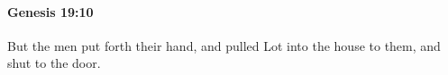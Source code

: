 
		\paragraph{Genesis 19:10} %
			\label{GENESIS-19-10}

			But the men put forth their hand, and pulled Lot into the house to them, and shut to the door.


